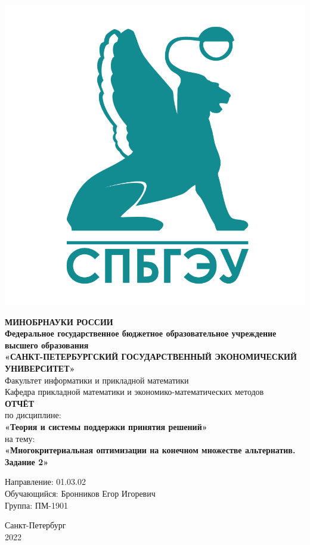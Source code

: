 \documentclass[14pt,fleqn]{extarticle}
\begin{document}
	\begin{titlepage}
		\includegraphics[scale=0.12]{logo}
		\begin{center}
			\textbf{МИНОБРНАУКИ РОССИИ}\\
			\vspace{0.2cm}
			\textbf{Федеральное государственное бюджетное образовательное учреждение высшего образования}\\
			\textbf{«САНКТ-ПЕТЕРБУРГСКИЙ ГОСУДАРСТВЕННЫЙ ЭКОНОМИЧЕСКИЙ УНИВЕРСИТЕТ»}\\
			\vspace{0.6cm}
			Факультет информатики и прикладной математики\\
			Кафедра прикладной математики и экономико-математических методов\\
			\vspace{1cm}
			\textbf{ОТЧЁТ}\\
			по дисциплине:\\
			\textbf{«Теория и системы поддержки принятия решений»}\\
			на тему:\\
			\textbf{«Многокритериальная оптимизации на конечном множестве альтернатив. Задание 2»}\\
		\end{center}
		\vspace{1cm}
		Направление: 01.03.02\\
		Обучающийся: Бронников Егор Игоревич\\
		Группа: ПМ-1901\\
		\vfill
		\begin{center}
			Санкт-Петербург\\
			2022\\
		\end{center}
	\end{titlepage}
	
\end{document}
